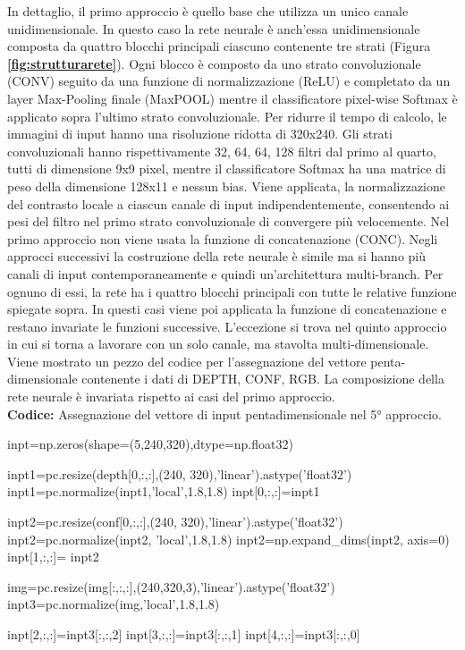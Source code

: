 In dettaglio, il primo approccio è quello base che utilizza un unico canale unidimensionale. In questo caso la rete neurale è anch'essa unidimensionale composta da quattro blocchi principali ciascuno contenente tre strati (Figura \textbf{\ref{fig:strutturarete}}). Ogni blocco è composto da uno strato convoluzionale (CONV) seguito da una funzione di normalizzazione (ReLU) e completato da un layer Max-Pooling finale (MaxPOOL) mentre il classificatore pixel-wise Softmax è applicato sopra l'ultimo strato convoluzionale.
Per ridurre il tempo di calcolo, le immagini di input hanno una risoluzione ridotta di 320x240. Gli strati convoluzionali hanno rispettivamente 32, 64, 64, 128 filtri dal primo al quarto, tutti di dimensione 9x9 pixel, mentre il classificatore Softmax ha una
matrice di peso della dimensione 128x11 e nessun bias.
Viene applicata, la normalizzazione del contrasto locale a ciascun canale di input indipendentemente, consentendo ai pesi del filtro nel primo strato convoluzionale di convergere più velocemente.
Nel primo approccio non viene usata la funzione di concatenazione (CONC).
Negli approcci successivi la costruzione della rete neurale è simile ma si hanno più canali di input contemporaneamente e quindi un'architettura multi-branch. Per ognuno di essi, la rete ha i quattro blocchi principali con tutte le relative funzione spiegate sopra.
In questi casi viene poi applicata la funzione di concatenazione e restano invariate le funzioni successive.
L'eccezione si trova nel quinto approccio in cui si torna a lavorare con un solo canale, ma stavolta multi-dimensionale.
Viene mostrato un pezzo del codice per l'assegnazione del vettore penta-dimensionale contenente i dati di DEPTH, CONF, RGB.
La composizione della rete neurale è invariata rispetto ai casi del primo approccio. \\

\textbf{Codice:} Assegnazione del vettore di input pentadimensionale nel 5° approccio.
\begin{python}
inpt=np.zeros(shape=(5,240,320),dtype=np.float32)

inpt1=pc.resize(depth[0,:,:],(240, 320),'linear').astype('float32')
inpt1=pc.normalize(inpt1,'local',1.8,1.8)
inpt[0,:,:]=inpt1

inpt2=pc.resize(conf[0,:,:],(240, 320),'linear').astype('float32')
inpt2=pc.normalize(inpt2, 'local',1.8,1.8)
inpt2=np.expand_dims(inpt2, axis=0)
inpt[1,:,:]= inpt2
        
img=pc.resize(img[:,:,:],(240,320,3),'linear').astype('float32')
inpt3=pc.normalize(img,'local',1.8,1.8)
        
inpt[2,:,:]=inpt3[:,:,2]
inpt[3,:,:]=inpt3[:,:,1]
inpt[4,:,:]=inpt3[:,:,0]
\end{python}


